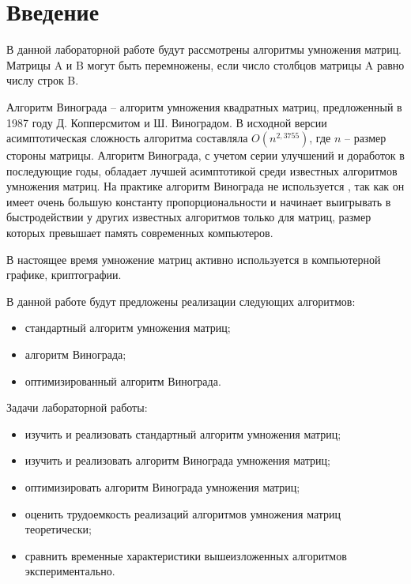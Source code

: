 \chapter*{Введение}

В данной лабораторной работе будут рассмотрены алгоритмы умножения матриц.
Матрицы A и B могут быть перемножены, если число столбцов матрицы A равно числу строк B.

Алгоритм Винограда -- алгоритм умножения квадратных матриц, предложенный в 1987 году Д. Копперсмитом и Ш. Виноградом.
В исходной версии асимптотическая сложность алгоритма составляла $O(n^{2,3755})$, где $n$ -- размер стороны матрицы.
Алгоритм Винограда, с учетом серии улучшений и доработок в последующие годы, обладает лучшей асимптотикой среди известных алгоритмов умножения матриц.
На практике алгоритм Винограда не используется \cite{alg}, так как он имеет очень большую константу пропорциональности и начинает выигрывать в быстродействии у других известных алгоритмов только для матриц, размер которых превышает память современных компьютеров.

В настоящее время умножение матриц активно используется в компьютерной графике, криптографии.

В данной работе будут предложены реализации следующих алгоритмов:
\begin{itemize}
	\item стандартный алгоритм умножения матриц;
	\item алгоритм Винограда;
	\item оптимизированный алгоритм Винограда.
\end{itemize}


Задачи лабораторной работы:
\begin{itemize}
	\item изучить и реализовать стандартный алгоритм умножения матриц;
	\item изучить и реализовать алгоритм Винограда умножения матриц;
	\item оптимизировать алгоритм Винограда умножения матриц;
	\item оценить трудоемкость реализаций алгоритмов умножения матриц теоретически;
	\item сравнить временные характеристики вышеизложенных алгоритмов экспериментально.
\end{itemize}
